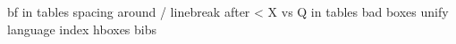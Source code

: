 bf in tables  
spacing around /
linebreak after <
X vs Q in tables
bad boxes
unify language index 
hboxes
bibs
 